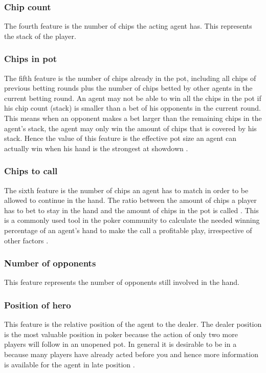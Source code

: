 \subsubsection{Chip count}
The fourth feature is the number of chips the acting agent has. This represents the stack of the player. 
\subsubsection{Chips in pot}
The fifth feature is the number of chips already in the pot, including all chips of previous betting rounds plus the number of chips betted by other agents in the current betting round. An agent may not be able to win all the chips in the pot if his chip count (stack) is smaller than a bet of his opponents in the current round. This means when an opponent makes a bet larger than the remaining chips in the agent's stack, the agent may only win the amount of chips that is covered by his stack. Hence the value of this feature is the effective pot size an agent can actually win when his hand is the strongest at showdown \cite{evolutionary_methods}.
\subsubsection{Chips to call}
The sixth feature is the number of chips an agent has to match in order to be allowed to continue in the hand. 
The ratio between the amount of chips a player has to bet to stay in the hand and the amount of chips in the pot is called . This is a commonly used tool in the poker community to calculate the needed winning percentage of an agent's hand to make the call a profitable play, irrespective of other factors \cite{evolutionary_methods}.
\subsubsection{Number of opponents}
This feature represents the number of opponents still involved in the hand.
\subsubsection{Position of hero}
This feature is the relative position of the agent to the dealer. The dealer position is the most valuable position in poker because the action of only two more players will follow in an unopened pot. In general it is desirable to be in a  because many players have already acted before you and hence more information is available for the agent in late position \cite{evolutionary_methods}.

